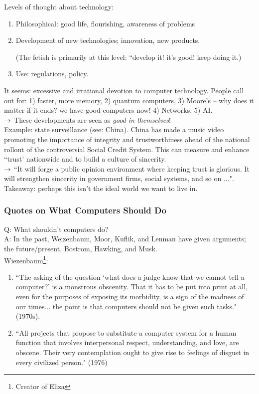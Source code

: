 Levels of thought about technology:
\begin{enumerate}
\item Philosophical: good life, flourishing, awareness of problems
\item Development of new technologies; innovation, new products.

(The fetish is primarily at this level: ``develop it! it's good! keep doing it.)

\item Use: regulations, policy.
\end{enumerate}


It seems: excessive and irrational devotion to computer technology. People call out for: 1) faster, more memory, 2) quantum computers, 3) Moore's -- why does it matter if it ends? we have good computers now! 4) Networks, 5) AI. \\

$\rightarrow$ These developments are seen as {\it good in themselves}! \\

Example: state surveillance (see: China). China has made a music video promoting the importance of integrity and trustworthiness ahead of the national rollout of the controversial Social Credit System. This can measure and enhance ``trust' nationwide and to build a culture of sincerity. \\

$\rightarrow$ ``It will forge a public opinion environment where keeping trust is glorious. It will strengthen sincerity in government firms, social systems, and so on ...". \\

Takeaway: perhaps this isn't the ideal world we want to live in.

\subsubsection{Quotes on What Computers Should Do}

Q: What shouldn't computers do? \\

A: In the past, Weizenbaum, Moor, Kuflik, and Lenman have given arguments; the future/present, Bostrom, Hawking, and Musk. \\

Wiezenbaum\footnote{Creator of Eliza}: 
\begin{enumerate}
\item ``The asking of the question `what does a judge know that we cannot tell a computer?' is a monstrous obscenity. That it has to be put into print at all, even for the purposes of exposing its morbidity, is a sign of the madness of our times... the point is that computers should not be given such tasks." (1970s). \\

\item ``All projects that propose to substitute a computer system for a human function that involves interpersonal respect, understanding, and love, are obscene. Their very contemplation ought to give rise to feelings of disgust in every civilized person." (1976)
\end{enumerate}

